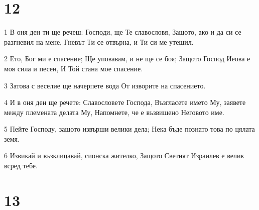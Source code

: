 \chapter{12}

\par 1 В оня ден ти ще речеш: Господи, ще Те славословя, Защото, ако и да си се разгневил на мене, Гневът Ти се отвърна, и Ти си ме утешил.
\par 2 Ето, Бог ми е спасение; Ще уповавам, и не ще се боя; Защото Господ Иеова е моя сила и песен, И Той стана мое спасение.
\par 3 Затова с веселие ще начерпете вода От изворите на спасението.
\par 4 И в оня ден ще речете: Славословете Господа, Възгласете името Му, заявете между племената делата Му, Напомнете, че е възвишено Неговото име.
\par 5 Пейте Господу, защото извърши велики дела; Нека бъде познато това по цялата земя.
\par 6 Извикай и възклицавай, сионска жителко, Защото Светият Израилев е велик всред тебе.

\chapter{13}

